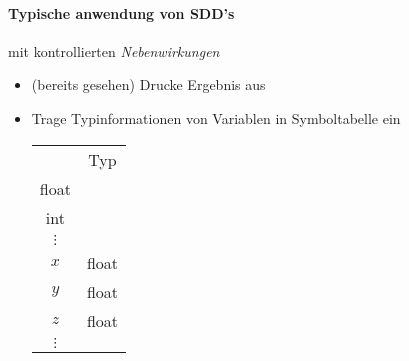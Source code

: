 \paragraph*{Typische anwendung von SDD's} mit kontrollierten \emph{Nebenwirkungen}
\begin{itemize}
\item   (bereits gesehen) Drucke Ergebnis aus
\item   Trage Typinformationen von Variablen in Symboltabelle ein
        \begin{center}
            \begin{tabular}{|c|c|}
                    & Typ \\\cline{1-1}
            float   &     \\\cline{1-1}
            int     &     \\\cline{1-1}
            $\vdots$&     \\\hline
            $x$     & float    \\\hline
            $y$     & float    \\\hline
            $z$     & float    \\\hline
            \multicolumn{1}{c}{$\vdots$} & \multicolumn{1}{c}{}
            \end{tabular}
        \end{center}

\end{itemize}
